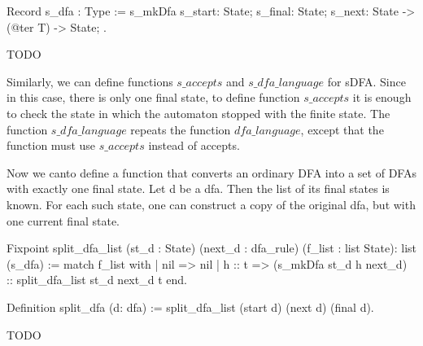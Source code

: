 \begin{listing}[h]
    \begin{pyglist}[language=coq, numbers=none, numbersep=5pt]
  Record s_dfa : Type :=
    s_mkDfa {
      s_start: State;
      s_final: State;
      s_next: State -> (@ter T) -> State;
  }.      
    \end{pyglist}
    \caption{TODO}
    \label{lst:verbments1}
\end{listing}
  
Similarly, we can define functions $s\_accepts$ and $s\_dfa\_language$ for sDFA. Since in this case, there is only one final state, to define function $s\_accepts$ it is enough to check the state in which the automaton stopped with the finite state. The function $s\_dfa\_language$ repeats the function $dfa\_language$, except that the function must use $s\_accepts$ instead of accepts.



Now we canto define a function that converts an ordinary DFA into a set of DFAs with exactly one final state.
Let d be a dfa. Then the list of its final states is known. For each such state, one can construct a copy of the original dfa, but with one current final state.

\begin{listing}[h]
    \begin{pyglist}[language=coq, numbers=none, numbersep=5pt]
  Fixpoint split_dfa_list 
      (st_d : State) 
      (next_d : dfa_rule) 
      (f_list : list State): list (s_dfa) :=
    match f_list with
    | nil => nil
    | h :: t => (s_mkDfa st_d h next_d) 
                :: split_dfa_list st_d next_d t
    end.    
 
 Definition split_dfa (d: dfa) := 
   split_dfa_list (start d) (next d) (final d).
    \end{pyglist}
    \caption{TODO}
    \label{lst:verbments1}
\end{listing}






